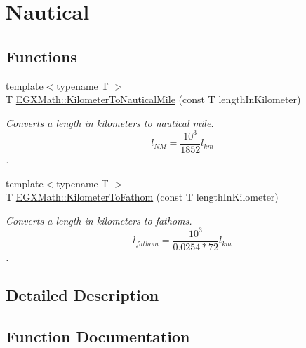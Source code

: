 \hypertarget{group___e_g_x_math-_conversions-_length_conversions-_s_i-_kilometer-_nautical}{}\section{Nautical}
\label{group___e_g_x_math-_conversions-_length_conversions-_s_i-_kilometer-_nautical}
\subsection*{Functions}
\begin{DoxyCompactItemize}
\item 
{\footnotesize template$<$typename T $>$ }\\T \mbox{\hyperlink{group___e_g_x_math-_conversions-_length_conversions-_s_i-_kilometer-_nautical_ga4571f464f551ae965f88192b53dd24ff}{E\+G\+X\+Math\+::\+Kilometer\+To\+Nautical\+Mile}} (const T length\+In\+Kilometer)
\begin{DoxyCompactList}\small\item\em Converts a length in kilometers to nautical mile. \[ l_{NM}= \frac{10^{3}}{1852} l_{km} \]. \end{DoxyCompactList}\item 
{\footnotesize template$<$typename T $>$ }\\T \mbox{\hyperlink{group___e_g_x_math-_conversions-_length_conversions-_s_i-_kilometer-_nautical_gaaecd42afaeaadc41e885dbf49bebae83}{E\+G\+X\+Math\+::\+Kilometer\+To\+Fathom}} (const T length\+In\+Kilometer)
\begin{DoxyCompactList}\small\item\em Converts a length in kilometers to fathoms. \[ l_{fathom}= \frac{10^{3}}{0.0254 * 72} l_{km} \]. \end{DoxyCompactList}\end{DoxyCompactItemize}


\subsection{Detailed Description}


\subsection{Function Documentation}
\mbox{\label{group___e_g_x_math-_conversions-_length_conversions-_s_i-_kilometer-_nautical_gaaecd42afaeaadc41e885dbf49bebae83}} 

